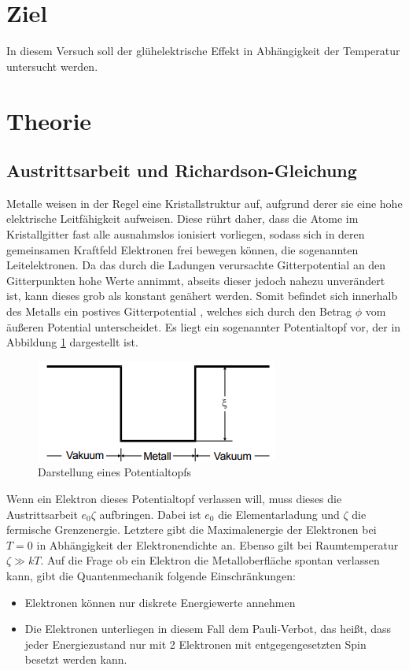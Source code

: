 
\section{Ziel}
In diesem Versuch soll der glühelektrische Effekt in Abhängigkeit der Temperatur untersucht werden.
\section{Theorie}
\subsection{Austrittsarbeit und Richardson-Gleichung}
Metalle weisen in der Regel eine Kristallstruktur auf, aufgrund derer sie eine hohe elektrische Leitfähigkeit aufweisen. Diese rührt daher, dass die Atome im Kristallgitter fast alle ausnahmslos ionisiert vorliegen, sodass sich
in deren gemeinsamen Kraftfeld Elektronen frei bewegen können, die sogenannten Leitelektronen.
Da das durch die Ladungen verursachte Gitterpotential an den Gitterpunkten hohe Werte annimmt, abseits dieser jedoch nahezu unverändert ist, kann dieses grob als konstant genähert werden.
Somit befindet sich innerhalb des Metalls ein postives Gitterpotential , welches sich durch den Betrag $\phi$ vom äußeren Potential unterscheidet. Es liegt ein sogenannter Potentialtopf vor, der in Abbildung \ref{fig:pt} dargestellt ist.
\begin{figure}[H]
  \centering
  \includegraphics{Text/Bilder/Potentialtopf.png}
  \caption{Darstellung eines Potentialtopfs \cite[93]{sample}}
  \label{fig:pt}
\end{figure}
Wenn ein Elektron dieses Potentialtopf verlassen will, muss dieses die Austrittsarbeit $e_0 \zeta$ aufbringen. Dabei ist $e_0$ die Elementarladung und $\zeta$ die fermische Grenzenergie.
Letztere gibt die Maximalenergie der Elektronen bei $T=0$ in Abhängigkeit der Elektronendichte an. Ebenso gilt bei Raumtemperatur $\zeta \gg kT$.
Auf die Frage ob ein Elektron die Metalloberfläche spontan verlassen kann, gibt die Quantenmechanik folgende Einschränkungen:
\begin{itemize}
\item Elektronen können nur diskrete Energiewerte annehmen
\item Die Elektronen unterliegen in diesem Fall dem Pauli-Verbot, das heißt, dass jeder Energiezustand nur mit 2 Elektronen mit entgegengesetzten Spin besetzt werden kann.
\end{itemize}
